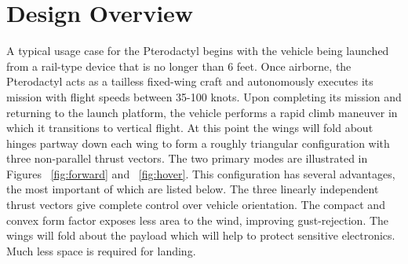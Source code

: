 \documentclass[]{aiaa-tc}%
\begin{document}
\section{Design Overview}
A typical usage case for the Pterodactyl begins with the vehicle being launched from a rail-type device that is no longer than 6 feet. Once airborne, the Pterodactyl acts as a tailless fixed-wing craft and autonomously executes its mission with flight speeds between 35-100 knots. Upon completing its mission and returning to the launch platform, the vehicle performs a rapid climb maneuver in which it transitions to vertical flight. At this point the wings will fold about hinges partway down each wing to form a roughly triangular configuration with three non-parallel thrust vectors. The two primary modes are illustrated in Figures ~\ref{fig:forward} and ~\ref{fig:hover}. This configuration has several advantages, the most important of which are listed below.
\newline
\newline
\textbullet \hspace{1 pt} The three linearly independent thrust vectors give complete control over vehicle orientation.
\newline
\textbullet \hspace{1 pt} The compact and convex form factor exposes less area to the wind, improving gust-rejection.
\newline
\textbullet \hspace{1 pt} The wings will fold about the payload which will help to protect sensitive electronics.
\newline
\textbullet \hspace{1 pt} Much less space is required for landing.
\end{document}
